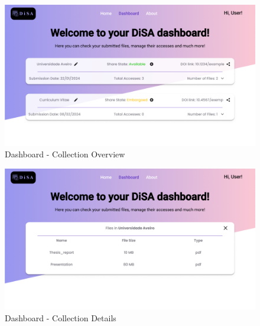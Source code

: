 \documentclass[a4paper,11pt]{article}
\begin{document}
                        \begin{figure}[htbp]
                        \centering
                        \includegraphics[width=0.8\linewidth]{images/Dashboard Page.png}
                        \caption{Dashboard - Collection Overview}
                        \end{figure}

                        \begin{figure}[htbp]
                        \centering
                        \includegraphics[width=0.8\linewidth]{images/Dashboard Page Expanded.png}
                        \caption{Dashboard - Collection Details}
                        \end{figure}

            \pagebreak
\end{document}
